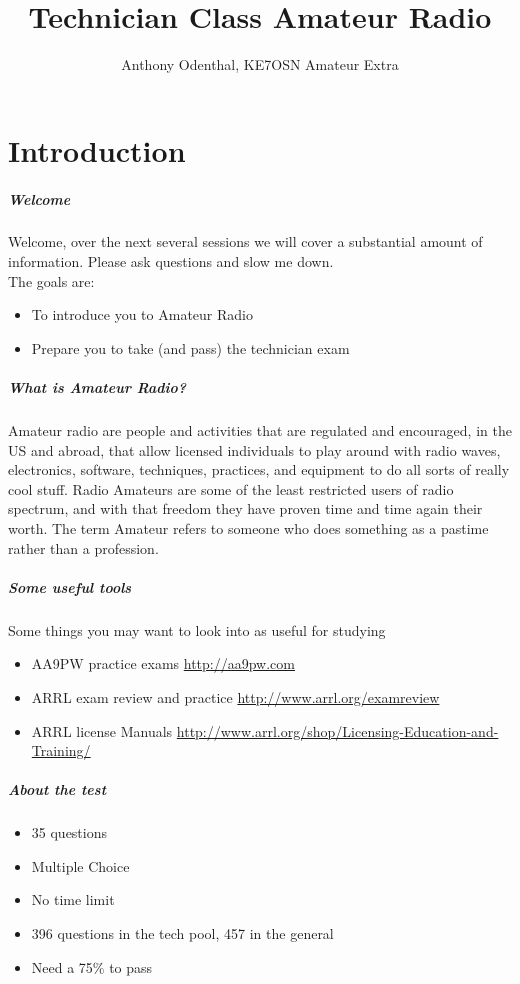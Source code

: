 \documentclass[10pt, handout]{beamer}
\author{Anthony Odenthal, KE7OSN Amateur Extra}
\title{Technician Class Amateur Radio}
\begin{document}
\frame{\titlepage}



\part{Introduction}


\begin{frame}
\frametitle{Welcome}
Welcome, over the next several sessions we will cover a substantial amount of information. Please ask questions and slow me down.\\
The goals are:
\begin{itemize}
\item To introduce you to Amateur Radio \pause
\item Prepare you to take (and pass) the technician exam \pause
\end{itemize}
\end{frame}

\begin{frame}
\frametitle{What is Amateur Radio?}
Amateur radio are people and activities that are regulated and encouraged, in the US and abroad, that allow licensed individuals to play around with radio waves, electronics, software, techniques, practices, and equipment to do all sorts of really cool stuff. Radio Amateurs are some of the least restricted users of radio spectrum, and with that freedom they have proven time and time again their worth.
The term Amateur refers to someone who does something as a pastime rather than a profession.
\end{frame}

\begin{frame}
\frametitle{Some useful tools}
Some things you may want to look into as useful for studying
\begin{itemize}
\item AA9PW practice exams \url{http://aa9pw.com}
\item ARRL exam review and practice \url{http://www.arrl.org/examreview}
\item ARRL license Manuals \url{http://www.arrl.org/shop/Licensing-Education-and-Training/}
\end{itemize}
\end{frame}

\begin{frame}
\frametitle{About the test}
\begin{itemize}
\item 35 questions \pause
\item Multiple Choice \pause
\item No time limit \pause
\item 396 questions in the tech pool, 457 in the general \pause
\item Need a 75\% to pass
\end{itemize}
\end{frame}
\end{document}
